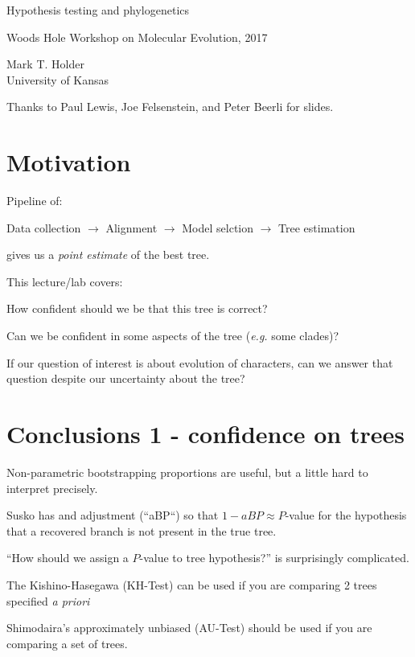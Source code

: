 \documentclass[landscape]{foils}
\begin{document}
\myNewSlide
\huge 
{\begin{center}Hypothesis testing and phylogenetics\end{center}}
\vskip 3cm
\large Woods Hole Workshop on Molecular Evolution, 2017\par 
\vskip 3cm
\normalsize
\normalsize
Mark T. Holder\\
University of Kansas\par 
\vskip 1cm
Thanks to Paul Lewis, Joe Felsenstein, and Peter Beerli for slides.

\myNewSlide
\section*{Motivation}
Pipeline of:\par
Data collection $\rightarrow$ Alignment $\rightarrow$ Model selction $\rightarrow$ Tree estimation

gives us a {\em point estimate} of the best tree.

This lecture/lab covers:
\begin{compactenum}
	\item How confident should we be that this tree is correct?
	\item Can we be confident in some aspects of the tree ({\em e.g.} some clades)?
	\item If our question of interest is about evolution of characters, can
		we answer that question despite our uncertainty about the tree?
\end{compactenum}


\myNewSlide
\section*{Conclusions 1 - confidence on trees}\large
\large
\begin{compactenum}
	\item Non-parametric bootstrapping proportions are useful, but a little hard to interpret  precisely.
	\begin{compactitem}
		\item Susko has and adjustment (``aBP``) so that $1 - aBP\approx P$-value for the hypothesis that a recovered branch is not present in the true tree. 
	\end{compactitem}
	\item ``How should we assign a $P$-value to tree hypothesis?'' is surprisingly complicated.
	\begin{compactitem}
		\item The Kishino-Hasegawa (KH-Test) can be used if you are comparing 2 trees specified {\em a priori}
		\item Shimodaira's approximately unbiased (AU-Test) should be used if you are comparing a set of trees.
	\end{compactitem}
\end{compactenum}
\end{document}
